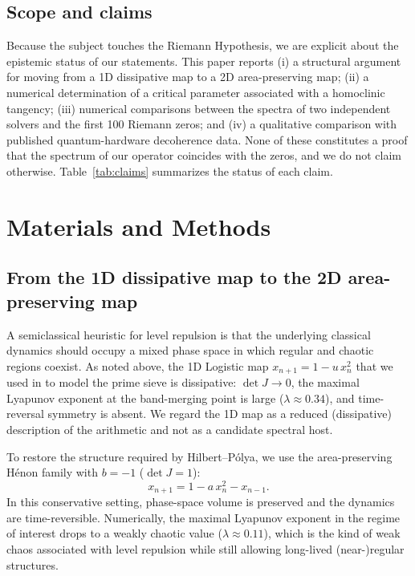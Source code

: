 \documentclass[11pt]{article}
\begin{document}
\subsection{Scope and claims}

Because the subject touches the Riemann Hypothesis, we are explicit about the epistemic status of our statements. This paper reports (i) a structural argument for moving from a 1D dissipative map to a 2D area-preserving map; (ii) a numerical determination of a critical parameter associated with a homoclinic tangency; (iii) numerical comparisons between the spectra of two independent solvers and the first 100 Riemann zeros; and (iv) a qualitative comparison with published quantum-hardware decoherence data. None of these constitutes a proof that the spectrum of our operator coincides with the zeros, and we do not claim otherwise. Table~\ref{tab:claims} summarizes the status of each claim.

\section{Materials and Methods}

\subsection{From the 1D dissipative map to the 2D area-preserving map}

A semiclassical heuristic for level repulsion is that the underlying classical dynamics should occupy a mixed phase space in which regular and chaotic regions coexist. As noted above, the 1D Logistic map $x_{n+1} = 1 - u\,x_n^2$ that we used in \cite{wang2026} to model the prime sieve is dissipative: $\det J \to 0$, the maximal Lyapunov exponent at the band-merging point is large ($\lambda \approx 0.34$), and time-reversal symmetry is absent. We regard the 1D map as a reduced (dissipative) description of the arithmetic and not as a candidate spectral host.

To restore the structure required by Hilbert--P\'olya, we use the area-preserving H\'enon family with $b=-1$ ($\det J = 1$):
\begin{equation}
x_{n+1} = 1 - a\,x_n^2 - x_{n-1}.
\label{eq:henon}
\end{equation}
In this conservative setting, phase-space volume is preserved and the dynamics are time-reversible. Numerically, the maximal Lyapunov exponent in the regime of interest drops to a weakly chaotic value ($\lambda \approx 0.11$), which is the kind of weak chaos associated with level repulsion while still allowing long-lived (near-)regular structures.
\end{document}
